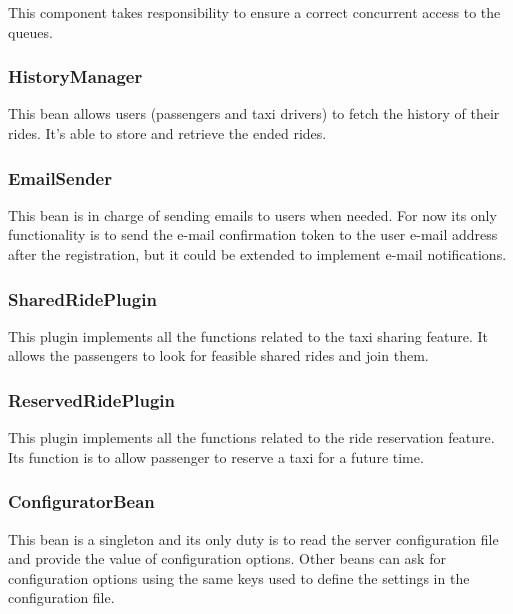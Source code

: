 This component takes responsibility to ensure a correct concurrent access to the queues.

\subsubsection{HistoryManager}
This bean allows users (passengers and taxi drivers) to fetch the history of their rides.
It's able to store and retrieve the ended rides.

\subsubsection{EmailSender}
This bean is in charge of sending emails to users when needed. For now its only functionality is to send the e-mail confirmation token to the user e-mail address after the registration, but it could be extended to implement e-mail notifications.

\subsubsection{SharedRidePlugin}
This plugin implements all the functions related to the taxi sharing feature.
It allows the passengers to look for feasible shared rides and join them.

\subsubsection{ReservedRidePlugin}
This plugin implements all the functions related to the ride reservation feature.
Its function is to allow passenger to reserve a taxi for a future time.

\subsubsection{ConfiguratorBean}
This bean is a singleton and its only duty is to read the server configuration file and provide the value of configuration options. Other beans can ask for configuration options using the same keys used to define the settings in the configuration file.

